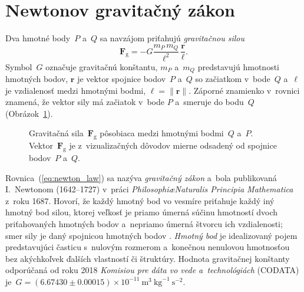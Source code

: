 \documentclass[a4paper,12pt]{book}
\newcommand{\gidx}{\mathrm g}
\let\vec\mathbf
\begin{document}
\section{Newtonov gravitačný zákon}
\label{sec:newton_law}

Dva hmotné body~$P$ a~$Q$ sa navzájom priťahujú \emph{gravitačnou silou}
%
\begin{equation}
\label{eq:newton_law}
\vec F_\gidx = -G \frac{m_P \, m_Q}{\ell^2} \, \frac{\vec r}{\ell}{.}
\end{equation}
%
Symbol~$G$ označuje gravitačnú konštantu, $m_P$ a~$m_Q$ predstavujú hmotnosti 
hmotných bodov, $\vec r$ je vektor spojnice bodov~$P$ a~$Q$ so začiatkom 
v~bode~$Q$ a~$\ell$ je vzdialenosť medzi hmotnými bodmi, $\ell = \| \vec r \|$.  
Záporné znamienko v~rovnici znamená, že vektor sily má začiatok v~bode $P$ 
a~smeruje do bodu~$Q$ (Obrázok~\ref{fig:newton_law}).

\begin{figure}[b]
\centering

\caption{Gravitačná sila~$\vec F_\gidx$ pôsobiaca medzi hmotnými bodmi~$Q$ 
a~$P$.  Vektor~$\vec F_\gidx$ je z~vizualizačných dôvodov mierne odsadený od 
spojnice bodov~$P$ a~$Q$.}
\label{fig:newton_law}
\end{figure}

Rovnica~(\ref{eq:newton_law}) sa nazýva \emph{gravitačný zákon} a~bola 
publikovaná I.~Newtonom (1642--1727) v~práci \emph{Philosophi\ae Naturalis 
Principia Mathematica} z~roku 1687.  Hovorí, že každý hmotný bod vo vesmíre 
priťahuje každý iný hmotný bod silou, ktorej veľkosť je priamo úmerná súčinu 
hmotností dvoch priťahovaných hmotných bodov a~nepriamo úmerná štvorcu ich 
vzdialenosti; smer sily je daný spojnicou hmotných bodov 
\parencite{Kellogg1967}.  \emph{Hmotný bod} je idealizovaný pojem predstavujúci 
časticu s~nulovým rozmerom a~konečnou nenulovou hmotnosťou bez akýchkoľvek 
ďalších vlastností či štruktúry.  Hodnota gravitačnej konštanty odporúčaná od 
roku 2018 \emph{Komisiou pre dáta vo vede a~technológiách} (CODATA) je~$G 
= (6.67430 \pm 0.00015) \times 10^{-11} \ \mathrm{m}^3 \ \mathrm{kg}^{-1} 
\ \mathrm{s}^{-2}$.
\end{document}
